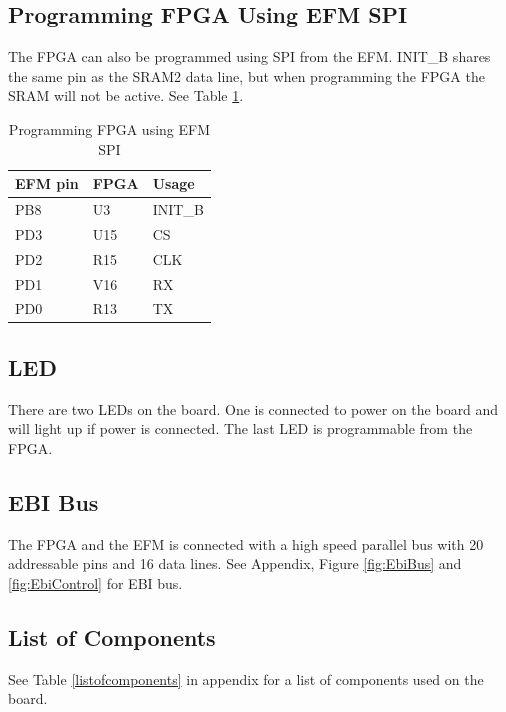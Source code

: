 \subsection{Programming FPGA Using EFM SPI}
The FPGA can also be programmed using SPI from the EFM.
INIT\_B shares the same pin as the SRAM2 data line, but when programming the FPGA the SRAM will not be active.
See Table \ref{tab:SpiProgrammer}.

\begin{table}[]
    \centering
    \begin{tabular}{lll}
        EFM pin & FPGA & Usage   \\
        \hline
        PB8     & U3   & INIT\_B \\
        PD3     & U15  & CS      \\
        PD2     & R15  & CLK     \\
        PD1     & V16  & RX      \\
        PD0     & R13  & TX
    \end{tabular}
    \caption{Programming FPGA using EFM SPI}
    \label{tab:SpiProgrammer}
\end{table}

\subsection{LED}
There are two LEDs on the board.
One is connected to power on the board and will light up if power is connected.
The last LED is programmable from the FPGA.

\subsection{EBI Bus}
The FPGA and the EFM is connected with a high speed parallel bus with 20 addressable pins and 16 data lines.
See Appendix, Figure \ref{fig:EbiBus} and \ref{fig:EbiControl} for EBI bus.

\subsection{List of Components}
See Table \ref{listofcomponents} in appendix for a list of components used on the board.

